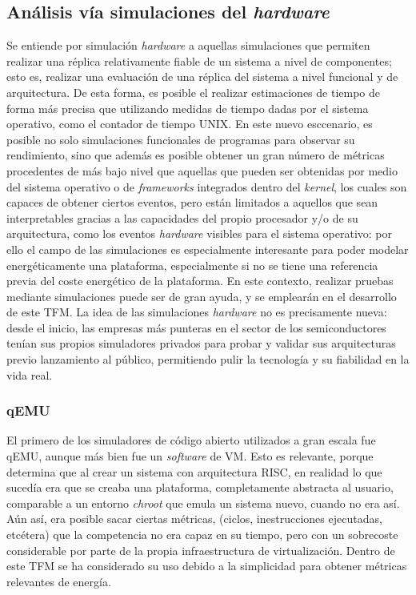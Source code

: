 \subsection{Análisis vía simulaciones del \textit{hardware}}
\label{sec:Gem5-qemu-estado-arte}
Se entiende por simulación \textit{hardware} a aquellas simulaciones que permiten realizar una réplica relativamente fiable de un sistema a nivel de componentes; esto es, realizar una evaluación de una réplica del sistema a nivel funcional y de arquitectura. De esta forma, es posible el realizar estimaciones de tiempo de forma más precisa que utilizando medidas de tiempo dadas por el sistema operativo, como el contador de tiempo UNIX. En este nuevo esccenario, es posible no solo simulaciones funcionales de programas para observar su rendimiento, sino que además es posible obtener un gran número de métricas procedentes de más bajo nivel que aquellas que pueden ser obtenidas por medio del sistema operativo o de \textit{frameworks} integrados dentro del \textit{kernel}, los cuales son capaces de obtener ciertos eventos, pero están limitados a aquellos que sean interpretables gracias a las capacidades del propio procesador y/o de su arquitectura, como los eventos \textit{hardware} visibles para el sistema operativo: por ello el campo de las simulaciones es especialmente interesante para poder modelar energéticamente una plataforma, especialmente si no se tiene una referencia previa del coste energético de la plataforma. En este contexto, realizar pruebas mediante simulaciones puede ser de gran ayuda, y se emplearán en el desarrollo de este \ac{TFM}. La idea de las simulaciones \textit{hardware} no es precisamente nueva: desde el inicio, las empresas más punteras en el sector de los semiconductores tenían sus propios simuladores privados para probar y validar sus arquitecturas previo lanzamiento al público, permitiendo pulir la tecnología y su fiabilidad en la vida real. 

\subsubsection{qEMU}
\label{subs:qemu}
El primero de los simuladores de código abierto utilizados a gran escala fue qEMU, aunque más bien fue un \textit{software} de \ac{VM}. Esto es relevante, porque determina que al crear un sistema con arquitectura \ac{RISC}, en realidad lo que sucedía era que se creaba una plataforma, completamente abstracta al usuario, comparable a un entorno \textit{chroot} que emula un sistema nuevo, cuando no era así. Aún así, era posible sacar ciertas métricas, (ciclos, inestrucciones ejecutadas, etcétera) que la competencia no era capaz en su tiempo, pero con un sobrecoste considerable por parte de la propia infraestructura de virtualización. Dentro de este \ac{TFM} se ha considerado su uso debido a la simplicidad para obtener métricas relevantes de energía.

